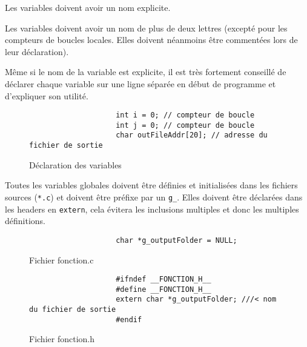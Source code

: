 			Les variables doivent avoir un nom explicite.

			Les variables doivent avoir un nom de plus de deux lettres (excepté pour les compteurs de boucles locales. Elles doivent néanmoins être commentées lors de leur déclaration).

			Même si le nom de la variable est explicite, il est très fortement conseillé de déclarer chaque variable sur une ligne séparée en début de programme et d'expliquer son utilité.

			\begin{figure}[H]
				\begin{changemargin}{-2.5cm}{-2.5cm}
				\begin{tcolorbox}
				\begin{verbatim}
					int i = 0; // compteur de boucle
					int j = 0; // compteur de boucle
					char outFileAddr[20]; // adresse du fichier de sortie
				\end{verbatim}
				\end{tcolorbox}
				\end{changemargin}
				\caption{Déclaration des variables}
			\end{figure}
			
			Toutes les variables globales doivent être définies et initialisées dans les fichiers sources (\verb+*.c+) et doivent être préfixe par un \verb+g_+. Elles doivent être déclarées dans les headers en \verb+extern+, cela évitera les inclusions multiples et donc les multiples définitions.

			\begin{figure}[H]
				\begin{changemargin}{-2.5cm}{-2.5cm}
				\begin{tcolorbox}
				\begin{verbatim}
					char *g_outputFolder = NULL;
				\end{verbatim}
				\end{tcolorbox}
				\end{changemargin}
				\caption{Fichier fonction.c}

				\begin{changemargin}{-2.5cm}{-2.5cm}
				\begin{tcolorbox}
				\begin{verbatim}
					#ifndef __FONCTION_H__
					#define __FONCTION_H__
					extern char *g_outputFolder; ///< nom du fichier de sortie
					#endif
				\end{verbatim}
				\end{tcolorbox}
				\end{changemargin}
				\caption{Fichier fonction.h}
			\end{figure}

